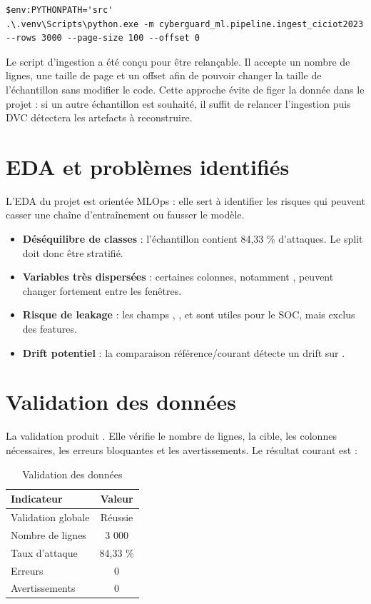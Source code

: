 \begin{lstlisting}
$env:PYTHONPATH='src'
.\.venv\Scripts\python.exe -m cyberguard_ml.pipeline.ingest_ciciot2023 --rows 3000 --page-size 100 --offset 0
\end{lstlisting}


Le script d'ingestion a été conçu pour être relançable. Il accepte un nombre de lignes, une taille de page et un offset afin de pouvoir changer la taille de l'échantillon sans modifier le code. Cette approche évite de figer la donnée dans le projet : si un autre échantillon est souhaité, il suffit de relancer l'ingestion puis DVC détectera les artefacts à reconstruire.

\section{EDA et problèmes identifiés}
L'EDA du projet est orientée MLOps : elle sert à identifier les risques qui peuvent casser une chaîne d'entraînement ou fausser le modèle.

\begin{itemize}
  \item \textbf{Déséquilibre de classes} : l'échantillon contient 84,33 \% d'attaques. Le split doit donc être stratifié.
  \item \textbf{Variables très dispersées} : certaines colonnes, notamment , peuvent changer fortement entre les fenêtres.
  \item \textbf{Risque de leakage} : les champs , ,  et  sont utiles pour le SOC, mais exclus des features.
  \item \textbf{Drift potentiel} : la comparaison référence/courant détecte un drift sur .
\end{itemize}

\section{Validation des données}
La validation produit . Elle vérifie le nombre de lignes, la cible, les colonnes nécessaires, les erreurs bloquantes et les avertissements. Le résultat courant est :

\begin{table}[H]
\centering
\caption{Validation des données}
\label{tab:data_validation}
\begin{tabularx}{0.75\linewidth}{@{}lC@{}}
\toprule
\textbf{Indicateur} & \textbf{Valeur}\\
\midrule
Validation globale & Réussie\\
Nombre de lignes & 3 000\\
Taux d'attaque & 84,33 \%\\
Erreurs & 0\\
Avertissements & 0\\
\bottomrule
\end{tabularx}
\end{table}

